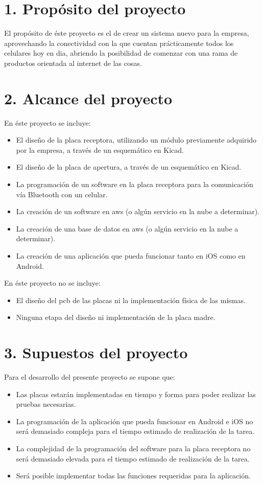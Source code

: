 \documentclass[11pt]{charter}
\begin{document}
\section{1. Propósito del proyecto}
\label{sec:proposito}


El propósito de éste proyecto es el de crear un sistema nuevo para la empresa, aprovechando la conectividad con la que cuentan prácticamente todos los celulares hoy en dia, abriendo la posibilidad de comenzar con una rama de productos orientada al internet de las cosas.


\section{2. Alcance del proyecto}
\label{sec:alcance}


En éste proyecto se incluye:
\begin{itemize}
\item El diseño de la placa receptora, utilizando un módulo previamente adquirido por la empresa, a través de un esquemático en Kicad.
\item El diseño de la placa de apertura, a través de un esquemático en Kicad.
\item La programación de un software en la placa receptora para la comunicación vía Bluetooth con un celular.
\item La creación de un software en aws (o algún servicio en la nube a determinar).
\item La creación de una base de datos en aws (o algún servicio en la nube a determinar).
\item La creación de una aplicación que pueda funcionar tanto en iOS como en Android.
\end{itemize}
En éste proyecto no se incluye:
\begin{itemize}
\item El diseño del pcb de las placas ni la implementación física de las mismas.
\item Ninguna etapa del diseño ni implementación de la placa madre.
\end{itemize}


\section{3. Supuestos del proyecto}
\label{sec:supuestos}

Para el desarrollo del presente proyecto se supone que:

\begin{itemize}
\item Las placas estarán implementadas en tiempo y forma para poder realizar las pruebas necesarias.
\item La programación de la aplicación que pueda funcionar en Android e iOS no será demasiado compleja para el tiempo estimado de realización de la tarea.
\item La complejidad de la programación del software para la placa receptora no será demasiado elevada para el tiempo estimado de realización de la tarea.
\item Será posible implementar todas las funciones requeridas para la aplicación.
\end{itemize}
\end{document}

